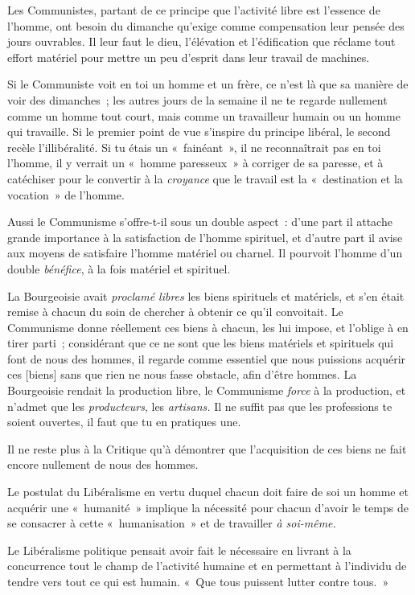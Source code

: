 \documentclass[french,twoside]{book} %
\newcommand\corr[1]{#1}
\begin{document}
Les Communistes, partant de ce principe que l’activité libre est l’essence de l’homme, ont besoin du dimanche qu’exige comme compensation leur pensée des jours ouvrables. Il leur faut le dieu, l’élévation et l’édification que réclame tout effort matériel pour mettre un peu d’esprit dans leur travail de machines.\par
Si le Communiste voit en toi un homme et un frère, ce n’est là que sa manière de voir des dimanches ; les autres jours de la semaine il ne te regarde nullement comme un homme tout court, mais comme un travailleur humain ou un homme qui travaille. Si le premier point de vue s’inspire du principe libéral, le second recèle l’illibéralité. Si tu étais un « fainéant », il ne reconnaîtrait pas en toi l’homme, il y verrait un « homme paresseux » à corriger de sa paresse, et à catéchiser pour le convertir à la \emph{croyance}  que le travail est la « destination et la vocation » de l’homme.\par
Aussi le Communisme s’offre-t-il sous un double aspect : d’une part il attache grande importance à la satisfaction de l’homme spirituel, et d’autre part il avise aux moyens de satisfaire l’homme matériel ou charnel. Il pourvoit l’homme d’un double \emph{bénéfice}, à la fois matériel et spirituel.\par
La Bourgeoisie avait \emph{proclamé libres} les biens spirituels et matériels, et s’en était remise à chacun du soin de chercher à obtenir ce qu’il convoitait. Le Communisme donne réellement ces biens à chacun, les lui impose, et l’oblige à en tirer parti ; considérant que ce ne sont que les biens matériels et spirituels qui font de nous des hommes, il regarde comme essentiel que nous puissions acquérir ces [{\corr biens}] sans que rien ne nous fasse obstacle, afin d’être hommes. La Bourgeoisie rendait la production libre, le Communisme \emph{force} à la production, et n’admet que les \emph{producteurs}, les \emph{artisans.} Il ne suffit pas que les professions te soient ouvertes, il faut que tu en pratiques une.\par
Il ne reste plus à la Critique qu’à démontrer que l’acquisition de ces biens ne fait encore nullement de nous des hommes.\par
Le postulat du Libéralisme en vertu duquel chacun doit faire de soi un homme et acquérir une « humanité » implique la nécessité pour chacun d’avoir le temps de se consacrer à cette « humanisation » et de travailler \emph{à soi-même.}\par
Le Libéralisme politique pensait avoir fait le nécessaire en livrant à la concurrence tout le champ de l’activité humaine et en permettant à l’individu de tendre vers tout ce qui est humain. « Que tous puissent lutter contre tous. »\par
\end{document}
